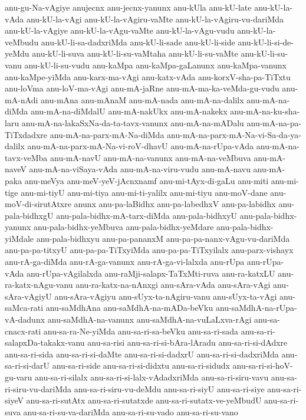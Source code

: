 {anu-gu-Na-vAgiye
anujecnx
anu-jecnx-yanunx
anu-kUla
anu-kU-late
anu-kU-la-vAda
anu-kU-la-vAgi
anu-kU-la-vAgiru-vaMte
anu-kU-la-vAgiru-vu-dariMda
anu-kU-la-vAgiye
anu-kU-la-vAgu-vaMte
anu-kU-la-vAgu-vudu
anu-kU-la-veMbudu
anu-kU-li-sa-dadxriMda
anu-kU-li-sade
anu-kU-li-side
anu-kU-li-si-de-yeMdu
anu-kU-li-suva
anu-kU-li-su-vaMtaha
anu-kU-li-su-vaMte
anu-kU-li-su-vanu
anu-kU-li-su-vudu
anu-kaMpa
anu-kaMpa-gaLanunx
anu-kaMpa-vanunx
anu-kaMpe-yiMda
anu-karx-ma-vAgi
anu-katx-vAda
anu-korxV-sha-pa-TiTxtu
anu-loVma
anu-loV-ma-vAgi
anu-mA-jaRne
anu-mA-ma-ka-veMda-gu-vudu
anu-mA-nAdi
anu-mAna
anu-mAnaM
anu-mA-nada
anu-mA-na-dalilx
anu-mA-na-diMda
anu-mA-na-diMdalU
anu-mA-nakUkx
anu-mA-nakekx
anu-mA-na-ku-sha-laru
anu-mA-na-lakaSxNa-da-ta-tavx-vanunx
anu-mA-na-mADalu
anu-mA-na-pa-TiTxdadxre
anu-mA-na-parx-mA-Na-diMda
anu-mA-na-parx-mA-Na-vi-Sa-da-ya-dalilx
anu-mA-na-parx-mA-Na-vi-roV-dhavU
anu-mA-na-rUpa-vAda
anu-mA-na-tavx-veMba
anu-mA-navU
anu-mA-na-vanunx
anu-mA-na-veMbuva
anu-mA-naveV
anu-mA-na-viSaya-vAda
anu-mA-na-viru-vudu
anu-mA-navu
anu-mA-paka
anu-meVya
anu-meV-yeV-jAcnxnamf
anu-mi-tAyx-di-gaLu
anu-miti
anu-mi-tige
anu-mi-tiyU
anu-mi-tiya
anu-mi-ti-yalilx
anu-mi-tiyu
anu-moV-dane
anu-moV-di-sirutAtxre
anunx
anu-pa-laBidhx
anu-pa-labedhxV
anu-pa-labidhx
anu-pala-bidhxgU
anu-pala-bidhx-mA-tarx-diMda
anu-pala-bidhxyU
anu-pala-bidhx-yanunx
anu-pala-bidhx-yeMbuva
anu-pala-bidhx-yeMdare
anu-pala-bidhx-yiMdale
anu-pala-bidhxyu
anu-pa-pananxM
anu-pa-pa-nanx-vAgu-vu-dariMda
anu-pa-pa-titxyU
anu-pa-pa-TiTxyiMda
anu-pa-pa-TiTxyilalx
anu-parx-vishayx
anu-rA-ga-diMda
anu-rA-ga-vanunx
anu-rA-ga-vi-lalxda
anu-rUpa
anu-rUpa-vAda
anu-rUpa-vAgilalxda
anu-raMji-salapx-TaTxMti-ruva
anu-ra-katxLU
anu-ra-katx-nAgu-vanu
anu-ra-katx-na-nAnxgi
anu-sAra-vAda
anu-sAra-vAgi
anu-sAra-vAgiyU
anu-sAra-vAgiyu
anu-sUyx-ta-nAgiru-vanu
anu-sUyx-ta-vAgi
anu-saMca-rati
anu-saMdhAna
anu-saMdhA-na-mADa-beVku
anu-saMdhA-na-rUpa-vA-dadunx
anu-saMdhA-na-vanunx
anu-saMdhA-na-vuLaLxva-rAgi
anu-sa-cnacx-rati
anu-sa-ra-Ne-yiMda
anu-sa-ri-sa-beVku
anu-sa-ri-sada
anu-sa-ri-salapxDa-takakx-vanu
anu-sa-risi
anu-sa-ri-si-bAra-lAradu
anu-sa-ri-si-dAdxre
anu-sa-ri-sida
anu-sa-ri-si-daMte
anu-sa-ri-si-dadxrU
anu-sa-ri-si-dadxriMda
anu-sa-ri-si-darU
anu-sa-ri-side
anu-sa-ri-si-didxtu
anu-sa-ri-sidudx
anu-sa-ri-si-hoV-gu-varu
anu-sa-ri-silalx
anu-sa-ri-si-lalx-vAdadxriMda
anu-sa-ri-siru-vavu
anu-sa-ri-siru-vu-dariMda
anu-sa-ri-siru-vu-deMdu
anu-sa-ri-siyU
anu-sa-ri-siye
anu-sa-ri-siyeV
anu-sa-ri-sutAtx
anu-sa-ri-sutatxde
anu-sa-ri-sutatx-ve-yeMbudU
anu-sa-ri-suva
anu-sa-ri-su-va-dariMda
anu-sa-ri-su-vado
anu-sa-ri-su-vano
}

